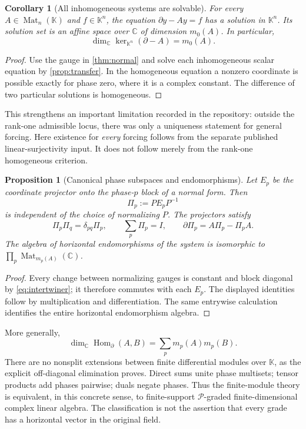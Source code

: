 \documentclass[11pt,a4paper]{article}
\numberwithin{equation}{section}
\newtheorem{proposition}[proposition]{Proposition}
\newtheorem{corollary}[corollary]{Corollary}
\theoremstyle{definition}
\theoremstyle{remark}
\newcommand{\K}{\mathbb K}
\newcommand{\C}{\mathbb C}
\newcommand{\PP}{\mathcal P}
\newcommand{\Hom}{\operatorname{Hom}}
\newcommand{\Mat}{\operatorname{Mat}}
\begin{document}
\begin{corollary}[All inhomogeneous systems are solvable]\label{cor:inhomogeneous}
For every $A\in\Mat_n(\K)$ and $f\in\K^n$, the equation
$\partial y-Ay=f$ has a solution in $\K^n$. Its solution set is an affine
space over $\C$ of dimension $m_0(A)$. In particular,
\[
 \dim_{\C}\ker_{\K^n}(\partial-A)=m_0(A).
\]
\end{corollary}
\begin{proof}
Use the gauge in \cref{thm:normal} and solve each inhomogeneous scalar
equation by \cref{prop:transfer}. In the homogeneous equation a nonzero
coordinate is possible exactly for phase zero, where it is a complex
constant. The difference of two particular solutions is homogeneous.
\end{proof}

This strengthens an important limitation recorded in the repository:
outside the rank-one admissible locus, there was only a uniqueness
statement for general forcing. Here existence for \emph{every} forcing
follows from the separate published linear-surjectivity input. It does not
follow merely from the rank-one homogeneous criterion.

\begin{proposition}[Canonical phase subspaces and endomorphisms]\label{prop:projectors}
Let $E_p$ be the coordinate projector onto the phase-$p$ block of a normal
form. Then
\[
 \Pi_p:=PE_pP^{-1}
\]
is independent of the choice of normalizing $P$. The projectors satisfy
\[
 \Pi_p\Pi_q=\delta_{pq}\Pi_p,\qquad
 \sum_p\Pi_p=I,\qquad
 \partial\Pi_p=A\Pi_p-\Pi_pA.
\]
The algebra of horizontal endomorphisms of the system is isomorphic to
$\prod_p\Mat_{m_p(A)}(\C)$.
\end{proposition}
\begin{proof}
Every change between normalizing gauges is constant and block diagonal by
\eqref{eq:intertwiner}; it therefore commutes with each $E_p$. The displayed
identities follow by multiplication and differentiation. The same entrywise
calculation identifies the entire horizontal endomorphism algebra.
\end{proof}

More generally,
\[
 \dim_{\C}\Hom_{\partial}(A,B)=\sum_p m_p(A)m_p(B).
\]
There are no nonsplit extensions between finite differential modules over
$\K$, as the explicit off-diagonal elimination proves. Direct sums unite
phase multisets; tensor products add phases pairwise; duals negate phases.
Thus the finite-module theory is equivalent, in this concrete sense, to
finite-support $\PP$-graded finite-dimensional complex linear algebra.
The classification is not the assertion that every grade has a horizontal
vector in the original field.
\end{document}
